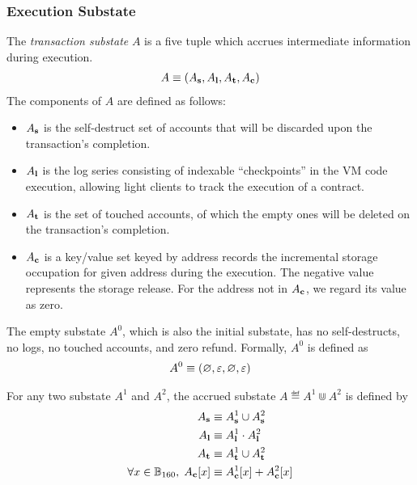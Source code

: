 
\subsubsection{Execution Substate}
\label{subsubsec:substate}
The \emph{transaction substate} $A$ is a five tuple which accrues intermediate information during execution. 
\begin{align}
	A\equiv \left( A_{\bf s}, A_{\bf l}, A_{\bf t}, A_{\bf c}\right)
\end{align}
The components of $A$ are defined as follows: 
\begin{itemize}[nosep]
	\item $A_{\bf s}$ is the self-destruct set of accounts that will be discarded upon the transaction's completion.

	\item $A_{\bf l}$ is the log series consisting of indexable ``checkpoints'' in the VM code execution, allowing light clients to track the execution of a contract.

	\item $A_{\bf t}$ is the set of touched accounts, of which the empty ones will be deleted on the transaction's completion.

	\item $A_{\bf c}$ is a key/value set keyed by address records the incremental storage occupation for given address during the execution. The negative value represents the storage release. For the address not in $A_{\bf c}$, we regard its value as zero.
	
\end{itemize}

The empty substate $A^0$, which is also the initial substate, has no self-destructs, no logs, no touched accounts, and zero refund. Formally, $A^0$ is defined as
\begin{align}
	A^0\equiv \left( \varnothing, \mathbb{\varepsilon}, \varnothing, \mathbb{\varepsilon}\right)
\end{align}

For any two substate $A^1$ and $A^2$, the accrued substate $A\eqdef A^1\Cup A^2$ is defined by 
\begin{align}
	A_{\bf s} &\equiv A^1_{\bf s} \cup A^2_{\bf s} \\ 
	A_{\bf l} &\equiv A^1_{\bf l} \cdot A^2_{\bf l} \\
	A_{\bf t} &\equiv A^1_{\bf t} \cup A^2_{\bf t} \\ 
	\forall x\in \mathbb{B}_{160}, \;A_{\bf c}[x] &\equiv A^1_{\bf c}[x] + A^2_{\bf c}[x]
\end{align}


